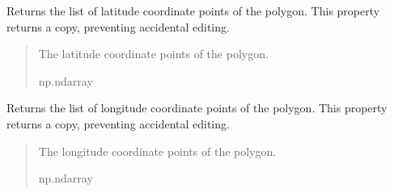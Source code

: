 \documentclass[letterpaper,10pt,english]{sphinxmanual}
\begin{document}
\begin{fulllineitems}
\begin{fulllineitems}
\label{\detokenize{modules/gps/zones:qnav.gps.zones.Polygon.lat_points}}
\pysigstartsignatures
{}
\pysigstopsignatures
\sphinxAtStartPar
Returns the list of latitude coordinate points of the polygon.
This property returns a copy, preventing accidental editing.
\begin{quote}\begin{description}
\sphinxAtStartPar
The latitude coordinate points of the polygon.

\sphinxAtStartPar
np.ndarray

\end{description}\end{quote}

\end{fulllineitems}


\begin{fulllineitems}
\label{\detokenize{modules/gps/zones:qnav.gps.zones.Polygon.lon_points}}
\pysigstartsignatures
{}
\pysigstopsignatures
\sphinxAtStartPar
Returns the list of longitude coordinate points of the polygon.
This property returns a copy, preventing accidental editing.
\begin{quote}\begin{description}
\sphinxAtStartPar
The longitude coordinate points of the polygon.

\sphinxAtStartPar
np.ndarray

\end{description}\end{quote}

\end{fulllineitems}



\end{fulllineitems}
\end{document}
